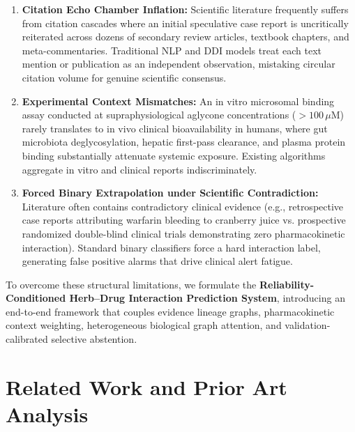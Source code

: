 \documentclass[10pt,journal,compsoc]{IEEEtran}
\begin{document}
\begin{enumerate}
    \item \textbf{Citation Echo Chamber Inflation:} Scientific literature frequently suffers from citation cascades where an initial speculative case report is uncritically reiterated across dozens of secondary review articles, textbook chapters, and meta-commentaries. Traditional NLP and DDI models treat each text mention or publication as an independent observation, mistaking circular citation volume for genuine scientific consensus.
    \item \textbf{Experimental Context Mismatches:} An in vitro microsomal binding assay conducted at supraphysiological aglycone concentrations ($>100\,\mu\text{M}$) rarely translates to in vivo clinical bioavailability in humans, where gut microbiota deglycosylation, hepatic first-pass clearance, and plasma protein binding substantially attenuate systemic exposure. Existing algorithms aggregate in vitro and clinical reports indiscriminately.
    \item \textbf{Forced Binary Extrapolation under Scientific Contradiction:} Literature often contains contradictory clinical evidence (e.g., retrospective case reports attributing warfarin bleeding to cranberry juice vs. prospective randomized double-blind clinical trials demonstrating zero pharmacokinetic interaction). Standard binary classifiers force a hard interaction label, generating false positive alarms that drive clinical alert fatigue.
\end{enumerate}

To overcome these structural limitations, we formulate the \textbf{Reliability-Conditioned Herb--Drug Interaction Prediction System}, introducing an end-to-end framework that couples evidence lineage graphs, pharmacokinetic context weighting, heterogeneous biological graph attention, and validation-calibrated selective abstention.

\section{Related Work and Prior Art Analysis}
\end{document}
